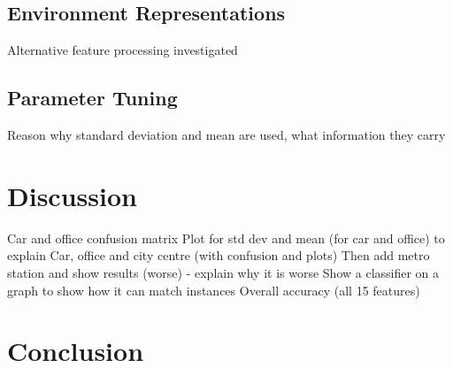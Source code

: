 \documentclass[11pt]{article}
\begin{document}
\begin{multicols}{2}
\subsection{Environment Representations}

Alternative feature processing investigated



\subsection{Parameter Tuning}

%
%
%



Reason why standard deviation and mean are used, what information they carry




\section{Discussion}




Car and office confusion matrix
Plot for std dev and mean (for car and office) to explain
Car, office and city centre (with confusion and plots)
Then add metro station and show results (worse) - explain why it is worse
Show a classifier on a graph to show how it can match instances
Overall accuracy (all 15 features)




\section{Conclusion}












\end{multicols}
\end{document}
